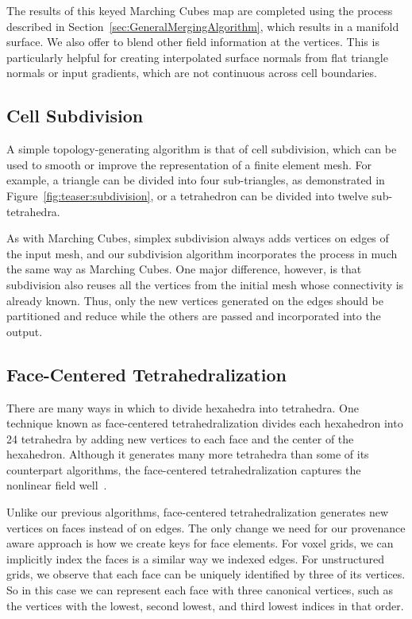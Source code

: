 \documentclass[10pt,journal,cspaper,compsoc]{IEEEtran}
\begin{document}
The results of this keyed Marching Cubes map are completed using the
 process described in
Section~\ref{sec:GeneralMergingAlgorithm}, which results in a manifold
surface.  We also offer to blend other field information at the vertices.
This is particularly helpful for creating interpolated surface normals from
flat triangle normals or input gradients, which are not continuous across
cell boundaries.

\subsection{Cell Subdivision}

A simple topology-generating algorithm is that of cell subdivision, which
can be used to smooth or improve the representation of a finite element
mesh.  For example, a triangle can be divided into four sub-triangles, as
demonstrated in Figure~\ref{fig:teaser:subdivision}, or a tetrahedron can
be divided into twelve sub-tetrahedra. 

As with Marching Cubes, simplex subdivision always adds vertices on edges
of the input mesh, and our subdivision algorithm incorporates the
 process in much the same way as Marching Cubes.  One major
difference, however, is that subdivision also reuses all the vertices from
the initial mesh whose connectivity is already known.  Thus, only the new
vertices generated on the edges should be partitioned and reduce while the
others are passed and incorporated into the output.

\subsection{Face-Centered Tetrahedralization}

There are many ways in which to divide hexahedra into tetrahedra.  One
technique known as face-centered tetrahedralization divides each hexahedron
into 24 tetrahedra by adding new vertices to each face and the center of
the hexahedron.  Although it generates many more tetrahedra than some of
its counterpart algorithms, the face-centered tetrahedralization captures
the nonlinear field well~\cite{Carr2006}.

Unlike our previous algorithms, face-centered tetrahedralization generates
new vertices on faces instead of on edges.  The only change we need for our
provenance aware approach is how we create keys for face elements.  For
voxel grids, we can implicitly index the faces is a similar way we indexed
edges.  For unstructured grids, we observe that each face can be uniquely
identified by three of its vertices.  So in this case we can represent each
face with three canonical vertices, such as the vertices with the lowest,
second lowest, and third lowest indices in that order.
\end{document}
